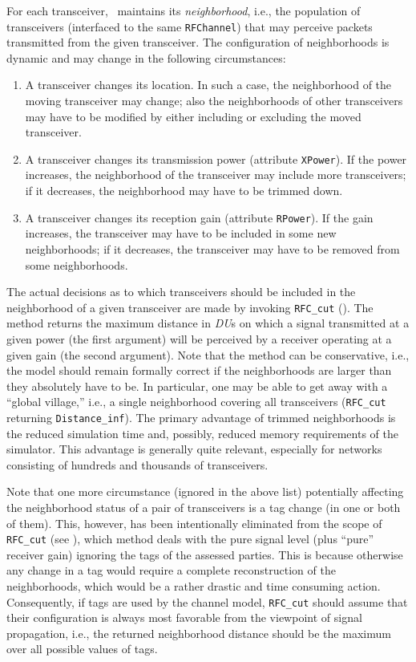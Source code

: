For each transceiver, \smurph\ maintains its {\em neighborhood}, i.e., the
population of transceivers (interfaced to the same {\tt RFChannel}) that may
perceive packets transmitted from the given transceiver.
The configuration of neighborhoods is dynamic and may change in the following
circumstances:

\begin{enumerate}
\item
A transceiver changes its location.
In such a case, the neighborhood of the moving transceiver may change; also
the neighborhoods of other transceivers may have to be modified by either
including or excluding the moved transceiver.
\item
A transceiver changes its transmission power (attribute {\tt XPower}).
If the power increases, the neighborhood of the transceiver may include more
transceivers; if it decreases, the neighborhood may have to be trimmed down.
\item
A transceiver changes its reception gain (attribute {\tt RPower}).
If the gain increases, the transceiver may have to be included in some
new neighborhoods; if it decreases, the transceiver may have to be removed
from some neighborhoods.
\end{enumerate}

The actual decisions as to which transceivers should be included in the
neighborhood of a given transceiver are made by invoking {\tt RFC\_cut}
().
The method returns the maximum distance in {\em DU\/}s on which a signal
transmitted at a given power (the first argument) will be perceived by
a receiver operating at a given gain (the second argument).
Note that the method can be conservative, i.e., the model should remain 
formally correct if the neighborhoods are larger than they absolutely have
to be.
In particular, one may be able to get away with a ``global village,'' i.e.,
a single neighborhood covering all transceivers ({\tt RFC\_cut} returning
{\tt Distance\_inf}).
The primary advantage of trimmed neighborhoods is the reduced simulation time
and, possibly, reduced memory requirements of the simulator.
This advantage is generally quite relevant, especially for networks consisting
of hundreds and thousands of transceivers.

Note that one more circumstance (ignored in the above list) potentially
affecting the neighborhood status of a pair of transceivers is a tag change
(in one or both of them).
This, however, has been intentionally eliminated from the scope of
{\tt RFC\_cut} (see ), which method deals with the
pure signal level (plus ``pure'' receiver gain) ignoring the tags of
the assessed parties.
This is because otherwise any change in a tag would require a complete
reconstruction of the neighborhoods, which would be a rather drastic and time
consuming action.
Consequently, if tags are used by the channel model,
{\tt RFC\_cut} should assume that their configuration is always
most favorable from the viewpoint of signal propagation, i.e., the returned
neighborhood distance should be the maximum over all possible values of tags.

